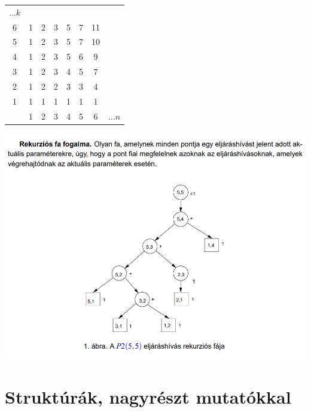 \documentclass{article}
\theoremstyle{mytheoremstyle}
\theoremstyle{mytheoremstyle}
\theoremstyle{myproblemstyle}
\begin{document}
\begin{center}
    \begin{tabular}{c|ccccccc}
        $\ldots k$\\
        6&1&2&3&5&7&11\\
        5&1&2&3&5&7&10\\
        4&1&2&3&5&6&9\\
        3&1&2&3&4&5&7\\
        2&1&2&2&3&3&4\\
        1&1&1&1&1&1&1\\
        \midrule&1&2&3&4&5&6& $\ldots n$ \\
    \end{tabular}
\end{center}
\begin{center}
    \includegraphics[height=10cm]{rekfa.png}
\end{center}
\section{Struktúrák, nagyrészt mutatókkal}
\end{document}
